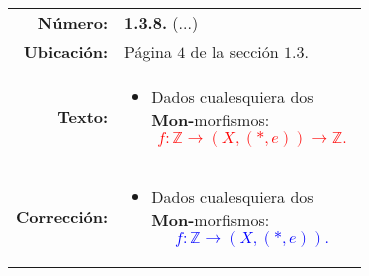 \documentclass[landscape]{slides}
\begin{document}
\begin{tabular}{r|p{0.7 \linewidth}}
	\textbf{Número:} & \textbf{1.3.8.} (...) \\ 
	\textbf{Ubicación:} & Página \(4\) de la sección \(1.3\). \\ 
	\textbf{Texto:} &
\begin{itemize}
	\item Dados cualesquiera dos \textbf{Mon-}morfismos:
		\textcolor{red}{
		\[
			f: \mathbb{Z} \longrightarrow (X,(*,e)) \longrightarrow \mathbb{Z}.
		\]
		}
\end{itemize} \\ 
	\textbf{Corrección:} & 
\begin{itemize}
	\item Dados cualesquiera dos \textbf{Mon-}morfismos:
		\textcolor{blue}{
		\[
			f: \mathbb{Z} \longrightarrow (X,(*,e)) .
		\]
		}
\end{itemize}
\end{tabular}
\end{document}
